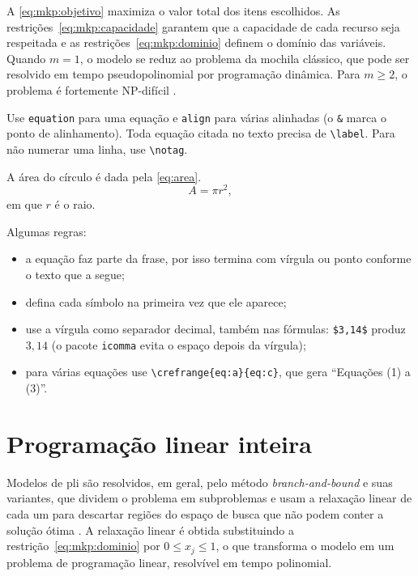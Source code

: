 A \cref{eq:mkp:objetivo} maximiza o valor total dos itens escolhidos. As
restrições~\eqref{eq:mkp:capacidade} garantem que a capacidade de cada recurso
seja respeitada e as restrições~\eqref{eq:mkp:dominio} definem o domínio das
variáveis. Quando $m = 1$, o modelo se reduz ao problema da mochila clássico,
que pode ser resolvido em tempo pseudopolinomial por programação dinâmica. Para
$m \geq 2$, o problema é fortemente NP-difícil \cite{kellerer2004knapsack}.

\begin{instrucao}
Use \verb|equation| para uma equação e \verb|align| para várias alinhadas
(o \verb|&| marca o ponto de alinhamento). Toda equação citada no texto
precisa de \verb|\label|. Para não numerar uma linha, use \verb|\notag|.
\begin{exemplo}
A área do círculo é dada pela
\cref{eq:area}.
\begin{equation}
  A = \pi r^2,
  \label{eq:area}
\end{equation}
em que $r$ é o raio.
\end{exemplo}
Algumas regras:
\begin{itemize}
  \item a equação faz parte da frase, por isso termina com vírgula ou ponto
        conforme o texto que a segue;
  \item defina cada símbolo na primeira vez que ele aparece;
  \item use a vírgula como separador decimal, também nas fórmulas: \verb|$3,14$|
        produz $3,14$ (o pacote \verb|icomma| evita o espaço depois da vírgula);
  \item para várias equações use \verb|\crefrange{eq:a}{eq:c}|, que gera
        ``Equações (1) a (3)''.
\end{itemize}
\end{instrucao}

\section{Programação linear inteira}
\label{sec:fundamentacao:pli}

Modelos de \acs{pli} são resolvidos, em geral, pelo método \emph{branch-and-bound}
e suas variantes, que dividem o problema em subproblemas e usam a relaxação
linear de cada um para descartar regiões do espaço de busca que não podem
conter a solução ótima \cite{wolsey2020integer}. A relaxação linear é obtida
substituindo a restrição~\eqref{eq:mkp:dominio} por $0 \leq x_j \leq 1$, o que
transforma o modelo em um problema de programação linear, resolvível em tempo
polinomial.

